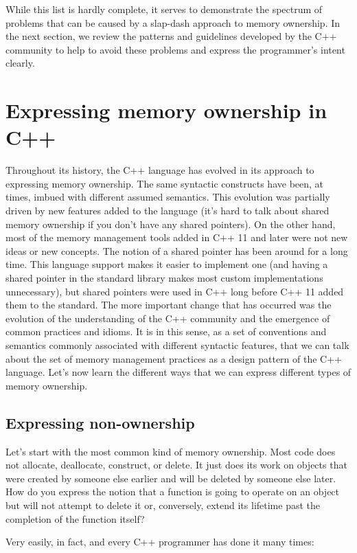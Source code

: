 While this list is hardly complete, it serves to demonstrate the spectrum of problems that can be caused by a slap-dash approach to memory ownership. In the next section, we review the patterns and guidelines developed by the C++ community to help to avoid these problems and express the programmer's intent clearly.

\section{Expressing memory ownership in C++}

Throughout its history, the C++ language has evolved in its approach to expressing memory ownership. The same syntactic constructs have been, at times, imbued with different assumed semantics. This evolution was partially driven by new features added to the language (it's hard to talk about shared memory ownership if you don't have any shared pointers). On the other hand, most of the memory management tools added in C++ 11 and later were not new ideas or new concepts. The notion of a shared pointer has been around for a long time. This language support makes it easier to implement one (and having a shared pointer in the standard library makes most custom implementations unnecessary), but shared pointers were used in C++ long before C++ 11 added them to the standard. The more important change that has occurred was the evolution of the understanding of the C++ community and the emergence of common practices and idioms. It is in this sense, as a set of conventions and semantics commonly associated with different syntactic features, that we can talk about the set of memory management practices as a design pattern of the C++ language. Let's now learn the different ways that we can express different types of memory ownership.

\subsection{Expressing non-ownership}

Let's start with the most common kind of memory ownership. Most code does not allocate, deallocate, construct, or delete. It just does its work on objects that were created by someone else earlier and will be deleted by someone else later. How do you express the notion that a function is going to operate on an object but will not attempt to delete it or, conversely, extend its lifetime past the completion of the function itself?

Very easily, in fact, and every C++ programmer has done it many times:

